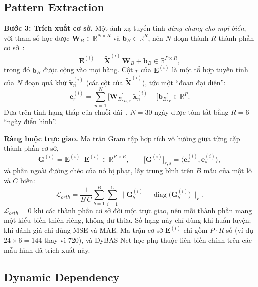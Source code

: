 \documentclass[conference]{IEEEtran}
\newcommand{\R}{\mathbb{R}}
\begin{document}
\subsection{Pattern Extraction}
\label{sec:pattern}

\textbf{Bước 3: Trích xuất cơ sở.} Một ánh xạ tuyến tính \emph{dùng chung cho mọi biến}, với tham số học được
$\mathbf{W}_B\in\R^{N\times R}$ và $\mathbf{b}_B\in\R^{R}$, nén $N$ đoạn thành $R$ thành phần
cơ sở~\cite{Huang2025TimeBase}:
\begin{equation}
\mathbf{E}^{(i)}=\tilde{\mathbf{X}}^{(i)}\,\mathbf{W}_B+\mathbf{b}_B\in\R^{P\times R},
\label{eq:basis}
\end{equation}
trong đó $\mathbf{b}_B$ được cộng vào mọi hàng. Cột $r$ của $\mathbf{E}^{(i)}$ là một tổ hợp tuyến tính của $N$ đoạn quá
khứ $\tilde{\mathbf{x}}^{(i)}_n$ (các cột của $\tilde{\mathbf{X}}^{(i)}$), tức một ``đoạn đại diện'':
\begin{equation}
\mathbf{e}^{(i)}_r=\sum_{n=1}^{N}\big[\mathbf{W}_B\big]_{n,r}\,\tilde{\mathbf{x}}^{(i)}_n+\big[\mathbf{b}_B\big]_r
\in\R^{P}.
\label{eq:basis-col}
\end{equation}
Dựa trên tính hạng thấp của chuỗi dài~\cite{Huang2025TimeBase}, $N=30$ ngày được tóm tắt bằng $R=6$ ``ngày điển hình''.

\textbf{Ràng buộc trực giao.} Ma trận Gram tập hợp tích vô hướng giữa từng cặp thành phần cơ sở,
\begin{equation}
\mathbf{G}^{(i)}=\mathbf{E}^{(i)\top}\mathbf{E}^{(i)}\in\R^{R\times R},\qquad
\big[\mathbf{G}^{(i)}\big]_{r,s}=\big\langle\mathbf{e}^{(i)}_r,\mathbf{e}^{(i)}_s\big\rangle,
\label{eq:gram}
\end{equation}
và phần ngoài đường chéo của nó bị phạt, lấy trung bình trên $B$ mẫu của một lô và $C$ biến:
\begin{equation}
\mathcal{L}_{orth}=\frac{1}{B\,C}\sum_{b=1}^{B}\sum_{i=1}^{C}
\big\|\mathbf{G}^{(i)}_b-\operatorname{diag}\big(\mathbf{G}^{(i)}_b\big)\big\|_F .
\label{eq:orth}
\end{equation}
$\mathcal{L}_{orth}=0$ khi các thành phần cơ sở đôi một trực giao, nên mỗi thành phần mang một kiểu biến thiên riêng,
không dư thừa. Số hạng này chỉ dùng khi huấn luyện; khi đánh giá chỉ dùng MSE và MAE. Ma trận cơ sở $\mathbf{E}^{(i)}$
chỉ gồm $P\cdot R$ số (ví dụ $24\times6=144$ thay vì 720), và DyBAS-Net học phụ thuộc liên biến chính trên các mẫu hình
đã trích xuất này.

\subsection{Dynamic Dependency}
\label{sec:dependency}
\end{document}

